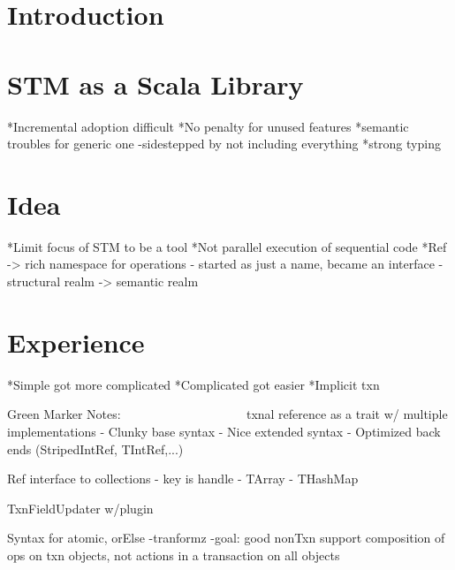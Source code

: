 \documentclass[preprint]{sigplanconf}
\begin{document}

\terms
\xterms

\keywords
\xkeywords

\section{Introduction}
\label{intro}


\section{STM as a Scala Library}
\label{library}
*Incremental adoption difficult
*No penalty for unused features
*semantic troubles for generic one
   -sidestepped by not including everything
*strong typing


\section{Idea}
%
*Limit focus of STM to be a tool
*Not parallel execution of sequential code
*Ref -> rich namespace for operations
   - started as just a name, became an interface
   - structural realm -> semantic realm

\section{Experience}
%
*Simple got more complicated
*Complicated got easier
*Implicit txn


Green Marker Notes:
~~~~~~~~~~~~~~~~~~~
txnal reference as a trait
    w/ multiple implementations
  - Clunky base syntax
  - Nice extended syntax
  - Optimized back ends (StripedIntRef, TIntRef,...)

Ref interface to collections
  - key is handle
  - TArray
  - THashMap

TxnFieldUpdater w/plugin

Syntax for atomic, orElse
  -tranformz
  -goal: good nonTxn support
        composition of ops on txn objects, 
        not actions in a transaction on all objects

\end{document}
